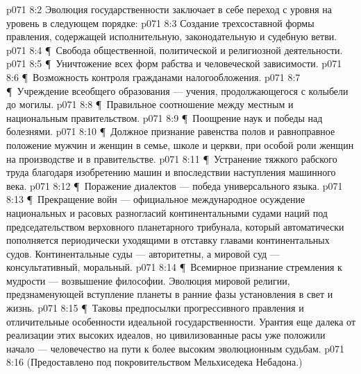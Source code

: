 \vs p071 8:2 Эволюция государственности заключает в себе переход с уровня на уровень в следующем порядке:
\vs p071 8:3 \bibnobreakspace Создание трехсоставной формы правления, содержащей исполнительную, законодательную и судебную ветви.
\vs p071 8:4 \P\ \bibnobreakspace Свобода общественной, политической и религиозной деятельности.
\vs p071 8:5 \P\ \bibnobreakspace Уничтожение всех форм рабства и человеческой зависимости.
\vs p071 8:6 \P\ \bibnobreakspace Возможность контроля гражданами налогообложения.
\vs p071 8:7 \P\ \bibnobreakspace Учреждение всеобщего образования --- учения, продолжающегося с колыбели до могилы.
\vs p071 8:8 \P\ \bibnobreakspace Правильное соотношение между местным и национальным правительством.
\vs p071 8:9 \P\ \bibnobreakspace Поощрение наук и победы над болезнями.
\vs p071 8:10 \P\ \bibnobreakspace Должное признание равенства полов и равноправное положение мужчин и женщин в семье, школе и церкви, при особой роли женщин на производстве и в правительстве.
\vs p071 8:11 \P\ \bibnobreakspace Устранение тяжкого рабского труда благодаря изобретению машин и впоследствии наступления машинного века.
\vs p071 8:12 \P\ \bibnobreakspace Поражение диалектов --- победа универсального языка.
\vs p071 8:13 \P\ \bibnobreakspace Прекращение войн --- официальное международное осуждение национальных и расовых разногласий континентальными судами наций под председательством верховного планетарного трибунала, который автоматически пополняется периодически уходящими в отставку главами континентальных судов. Континентальные суды --- авторитетны, а мировой суд --- консультативный, моральный.
\vs p071 8:14 \P\ \bibnobreakspace Всемирное признание стремления к мудрости --- возвышение философии. Эволюция мировой религии, предзнаменующей вступление планеты в ранние фазы установления в свет и жизнь.
\vs p071 8:15 \P\ Таковы предпосылки прогрессивного правления и отличительные особенности идеальной государственности. Урантия еще далека от реализации этих высоких идеалов, но цивилизованные расы уже положили начало --- человечество на пути к более высоким эволюционным судьбам.
\vs p071 8:16 (Предоставлено под покровительством Мельхиседека Небадона.)
